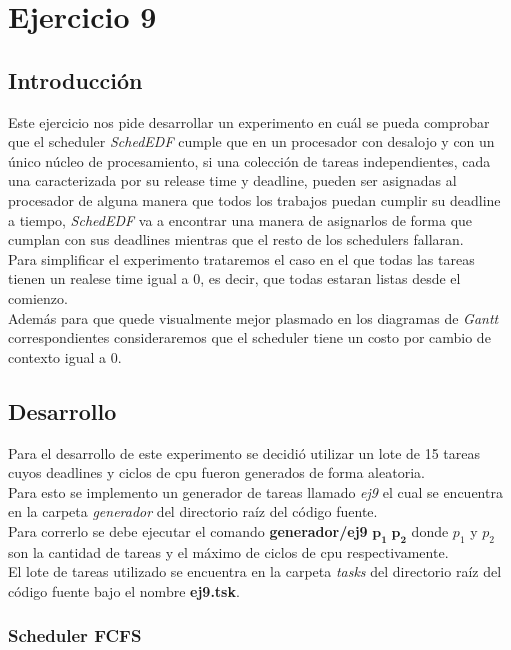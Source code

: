 \section{Ejercicio 9}

\subsection{Introducción}

Este ejercicio nos pide desarrollar un experimento en cuál se pueda comprobar que el scheduler \textit{SchedEDF} cumple que en un procesador con desalojo y con un único núcleo de procesamiento, si una colección de tareas independientes, cada una caracterizada por su release time y deadline, pueden ser asignadas al procesador de alguna manera que todos los trabajos puedan cumplir su deadline a tiempo, \textit{SchedEDF} va a encontrar una manera de asignarlos de forma que cumplan con sus
deadlines mientras que el resto de los schedulers fallaran.\\
Para simplificar el experimento trataremos el caso en el que todas las tareas tienen un realese time igual a 0, es decir, que todas estaran listas desde el comienzo.\\
Además para que quede visualmente mejor plasmado en los diagramas de \textit{Gantt} correspondientes consideraremos que el scheduler tiene un costo por cambio de contexto igual a 0.

\subsection{Desarrollo}
Para el desarrollo de este experimento se decidió utilizar un lote de 15 tareas cuyos deadlines y ciclos de cpu fueron generados de forma aleatoria.\\
Para esto se implemento un generador de tareas llamado \textit{ej9} el cual se encuentra en la carpeta \textit{generador} del directorio raíz del código fuente.\\
Para correrlo se debe ejecutar el comando \textbf{generador/ej9} $\mathbf{p_1 \; p_2}$ donde $p_1$ y $p_2$ son la cantidad de tareas y el máximo de ciclos de cpu respectivamente.\\
El lote de tareas utilizado se encuentra en la carpeta \textit{tasks} del directorio raíz del código fuente bajo el nombre \textbf{ej9.tsk}.

\subsubsection{Scheduler FCFS}


